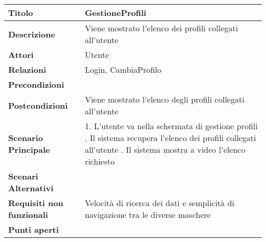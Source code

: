 \begin{tabular} {|P{4.5cm}|P{12.5cm}|}
  \hline
  \textbf{Titolo}                   & GestioneProfili                                               \\
  \hline
  \textbf{Descrizione}              & Viene mostrato l'elenco dei profili collegati all'utente      \\
  \hline
  \textbf{Attori}                   & Utente                                                        \\
  \hline
  \textbf{Relazioni}                & Login, CambiaProfilo                                          \\
  \hline
  \textbf{Precondizioni}            &                                                               \\
  \hline
  \textbf{Postcondizioni}           & Viene mostrato l'elenco degli profili collegati all'utente    \\
  \hline
  \textbf{Scenario Principale}      & 1. L'utente va nella schermata di gestione profili . Il sistema recupera l'elenco dei profili collegati all'utente . Il sistema mostra a video l'elenco richiesto                                                   \\
  \hline
  \textbf{Scenari Alternativi}      &                                                               \\
  \hline
  \textbf{Requisiti non funzionali} & Velocità di ricerca dei dati e
  semplicità di navigazione tra le diverse maschere                                                 \\
  \hline
  \textbf{Punti aperti}             &                                                               \\
  \hline
\end{tabular}
\hfill
\break

